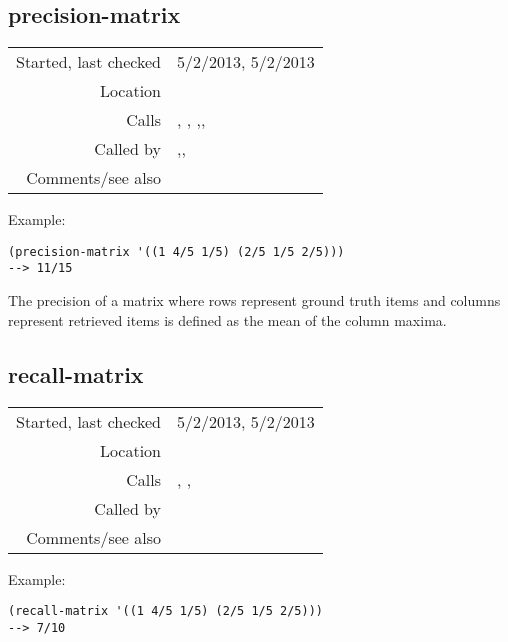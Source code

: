 \subsection*{precision-matrix}\label{fun:precision-matrix}

\vspace{0.3cm}
\begin{tabular}{r|p{8cm}}
Started, last checked & 5/2/2013, 5/2/2013 \\
Location & \nameref{sec:robust-metrics} \\
Calls & \nameref{fun:add-to-list}, \nameref{fun:first-n-naturals}, \nameref{fun:fibonacci-list},\newline \nameref{fun:max-item}, \nameref{fun:my-last} \\
Called by & \nameref{fun:establishment-metric},\newline \nameref{fun:occurrence-matrixnrel-idx},\newline \nameref{fun:occurrence-metric} \\
Comments/see also &
\end{tabular}

\vspace{0.5cm}
\noindent Example:
\begin{verbatim}
(precision-matrix '((1 4/5 1/5) (2/5 1/5 2/5)))
--> 11/15
\end{verbatim}

\noindent The precision of a matrix where rows
represent ground truth items and columns represent
retrieved items is defined as the mean of the column
maxima.


\subsection*{recall-matrix}\label{fun:recall-matrix}

\vspace{0.3cm}
\begin{tabular}{r|p{8cm}}
Started, last checked & 5/2/2013, 5/2/2013 \\
Location & \nameref{sec:robust-metrics} \\
Calls & \nameref{fun:fibonacci-list}, \nameref{fun:max-item}, \nameref{fun:my-last} \\
Called by & \nameref{fun:establishment-metric} \\
Comments/see also &
\end{tabular}

\vspace{0.5cm}
\noindent Example:
\begin{verbatim}
(recall-matrix '((1 4/5 1/5) (2/5 1/5 2/5)))
--> 7/10
\end{verbatim}

